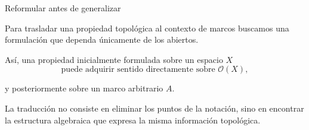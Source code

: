 \documentclass[compress,12pt]{beamer}
\begin{document}
\begin{frame}{Reformular antes de generalizar}
\small

Para trasladar una propiedad topológica al contexto de marcos
buscamos una formulación que dependa únicamente de los abiertos.

\medskip

\begin{center}
\end{center}

\pause

\medskip

Así, una propiedad inicialmente formulada sobre un espacio $X$
\[
    \text{puede adquirir sentido directamente sobre } \mathcal O(X),
\]

y posteriormente sobre un marco arbitrario $A$.

\medskip

\begin{block}{}
\centering
La traducción no consiste en eliminar los puntos de la notación,
sino en encontrar la estructura algebraica que expresa
la misma información topológica.
\end{block}

\end{frame}
\end{document}
